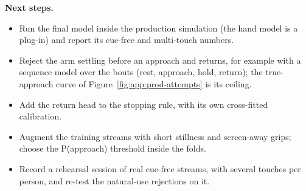 \textbf{Next steps.}
\begin{itemize}[nosep]
  \item Run the final model inside the production simulation (the hand model is a plug-in) and report its cue-free and multi-touch numbers.
  \item Reject the arm settling before an approach and returns, for example with a sequence model over the bouts (rest, approach, hold, return); the true-approach curve of Figure~\ref{fig:app:prod-attempts} is its ceiling.
  \item Add the return head to the stopping rule, with its own cross-fitted calibration.
  \item Augment the training streams with short stillness and screen-away grips; choose the P(approach) threshold inside the folds.
  \item Record a rehearsal session of real cue-free streams, with several touches per person, and re-test the natural-use rejections on it.
\end{itemize}

